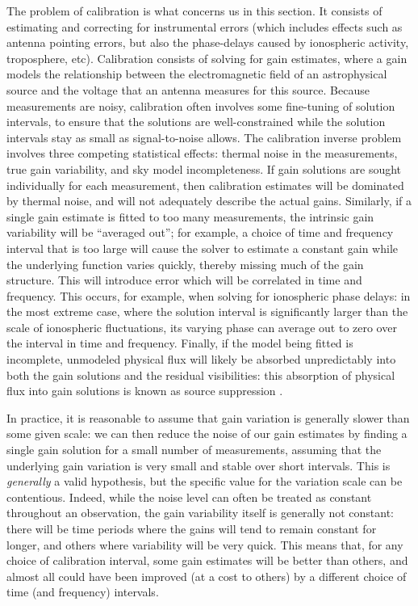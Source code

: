 \pg
The problem of calibration is what concerns us in this section. It consists of estimating and correcting for instrumental errors (which includes effects such as antenna pointing errors, but also the phase-delays caused by ionospheric activity, troposphere, etc). 
 {Calibration consists of solving for gain estimates, where a gain models the relationship between the electromagnetic field of an astrophysical source and the voltage that an antenna measures for this source. Because measurements are noisy, calibration often involves some fine-tuning of solution intervals, to ensure that the solutions are well-constrained while the solution intervals stay as small as signal-to-noise allows.} The calibration inverse problem involves three competing statistical effects: thermal noise in the measurements, true gain variability, and {sky} model incompleteness. If gain solutions {are sought individually for each measurement}, then calibration estimates will be dominated by thermal noise, and will not adequately describe the actual gains. Similarly, if a single gain estimate is fitted to too many measurements, the intrinsic gain variability will be ``averaged out''; for example, a choice of time and frequency interval that is too large will cause the solver to estimate a constant gain while the underlying function varies quickly, thereby missing much of the gain structure. This will introduce error which will be correlated in time and frequency. This occurs, for example, when solving for ionospheric phase delays: in the most extreme case, where the solution interval is significantly larger than the scale of ionospheric fluctuations, its varying phase can average out to zero over the interval in time and frequency. Finally, if the model being fitted is incomplete, unmodeled physical flux will likely be absorbed unpredictably into both the gain solutions and the residual visibilities: this absorption of physical flux into gain solutions is known as source suppression \citep[see][and references therein]{2014MNRAS.439.4030G,2013MNRAS.435..597K}.

\pg

In practice, it is reasonable to assume that gain variation is generally slower than some given scale: we can then reduce the noise of our gain estimates by finding a single gain solution for a small number of measurements, assuming that the underlying gain variation is very small and stable over short intervals. This is \emph{generally} a valid hypothesis, but the specific value for the variation scale can be contentious. Indeed, while the noise level can often be treated as constant throughout an observation, the gain variability itself is generally not constant: there will be time periods where the gains will tend to remain constant for longer, and others where variability will be very quick. This means that, for any choice of calibration interval, some gain estimates will be better than others, and almost all could have been improved (at a cost to others) by a different choice of time (and frequency) intervals. 

